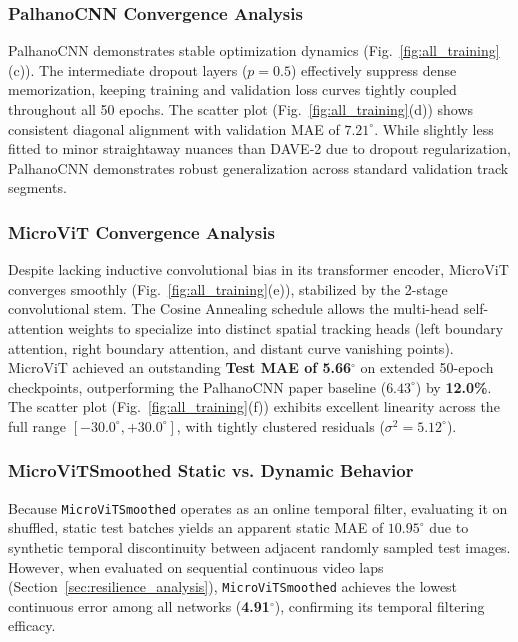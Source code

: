 \documentclass[10pt,journal,compsoc]{IEEEtran}
\begin{document}
\subsubsection{PalhanoCNN Convergence Analysis}
PalhanoCNN demonstrates stable optimization dynamics (Fig.~\ref{fig:all_training}(c)). The intermediate dropout layers ($p = 0.5$) effectively suppress dense memorization, keeping training and validation loss curves tightly coupled throughout all 50 epochs. 
The scatter plot (Fig.~\ref{fig:all_training}(d)) shows consistent diagonal alignment with validation MAE of $7.21^\circ$. While slightly less fitted to minor straightaway nuances than DAVE-2 due to dropout regularization, PalhanoCNN demonstrates robust generalization across standard validation track segments.

\subsubsection{MicroViT Convergence Analysis}
Despite lacking inductive convolutional bias in its transformer encoder, MicroViT converges smoothly (Fig.~\ref{fig:all_training}(e)), stabilized by the 2-stage convolutional stem. The Cosine Annealing schedule allows the multi-head self-attention weights to specialize into distinct spatial tracking heads (left boundary attention, right boundary attention, and distant curve vanishing points).
MicroViT achieved an outstanding \textbf{Test MAE of 5.66$^\circ$} on extended 50-epoch checkpoints, outperforming the PalhanoCNN paper baseline ($6.43^\circ$) by \textbf{12.0\%}. The scatter plot (Fig.~\ref{fig:all_training}(f)) exhibits excellent linearity across the full range $[-30.0^\circ, +30.0^\circ]$, with tightly clustered residuals ($\sigma^2 = 5.12^\circ$).

\subsubsection{MicroViTSmoothed Static vs. Dynamic Behavior}
Because \texttt{MicroViTSmoothed} operates as an online temporal filter, evaluating it on shuffled, static test batches yields an apparent static MAE of $10.95^\circ$ due to synthetic temporal discontinuity between adjacent randomly sampled test images. 
However, when evaluated on sequential continuous video laps (Section~\ref{sec:resilience_analysis}), \texttt{MicroViTSmoothed} achieves the lowest continuous error among all networks (\textbf{4.91$^\circ$}), confirming its temporal filtering efficacy.
\end{document}
